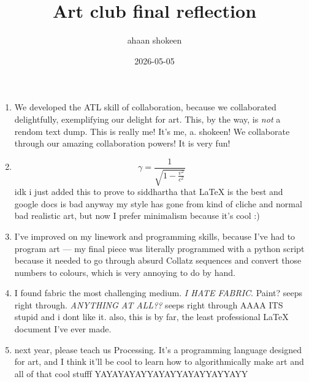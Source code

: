 \documentclass{article}
\title{Art club final reflection}
\author{ahaan shokeen}
\date{2026-05-05}
\begin{document}
\maketitle

\begin{enumerate}
    \item We developed the ATL skill of collaboration, because we collaborated delightfully, exemplifying our delight for art. This, by the way, is \emph{not} a rendom text dump. This is really me! It's me, a. shokeen! We collaborate through our amazing collaboration powers! It is very fun! 
    \item \begin{equation}
    \gamma = \frac{1}{\sqrt{1 - \frac{v^2}{c^2}}}
    \end{equation} idk i just added this to prove to siddhartha that \LaTeX{} is the best and google docs is bad anyway my style has gone from kind of cliche and normal bad realistic art, but now I prefer minimalism because it's cool :)
    \item I've improved on my linework and programming skills, because I've had to program art --- my final piece was literally programmed with a python script because it needed to go through absurd Collatz sequences and convert those numbers to colours, which is very annoying to do by hand.
    \item I found fabric the most challenging medium. \emph{I HATE FABRIC}. Paint? seeps right through. \emph{ANYTHING AT ALL??} seeps right through AAAA ITS stupid and i dont like it. also, this is by far, the least professional \LaTeX{} document I've ever made.
    \item next year, please teach us Processing. It's a programming language designed for art, and I think it'll be cool to learn how to algorithmically make art and all of that cool stufff YAYAYAYAYYAYAYYAYAYYAYYAYY
\end{enumerate}
\end{document}
